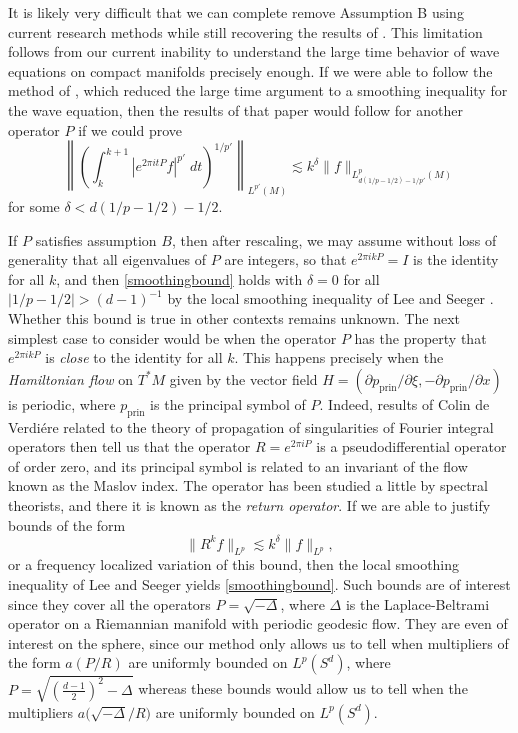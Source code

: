 \documentclass[11pt]{article}
\begin{document}
It is likely very difficult that we can complete remove Assumption B using current research methods while still recovering the results of \cite{DensonCharacterization}. This limitation follows from our current inability to understand the large time behavior of wave equations on compact manifolds precisely enough. If we were able to follow the method of \cite{DensonCharacterization}, which reduced the large time argument to a smoothing inequality for the wave equation, then the results of that paper would follow for another operator $P$ if we could prove
%
\begin{equation} \label{smoothingbound}
	\left\| \left( \int_k^{k+1} |e^{2 \pi i t P} f|^{p'}\; dt \right)^{1/p'} \right\|_{L^{p'}(M)} \lesssim k^\delta \| f \|_{L^p_{d(1/p - 1/2) - 1/p'}(M)}
\end{equation}
%
for some $\delta < d(1/p - 1/2) - 1/2$.

If $P$ satisfies assumption $B$, then after rescaling, we may assume without loss of generality that all eigenvalues of $P$ are integers, so that $e^{2 \pi i k P} = I$ is the identity for all $k$, and then \eqref{smoothingbound} holds with $\delta = 0$ for all $|1/p - 1/2| > (d-1)^{-1}$ by the local smoothing inequality of Lee and Seeger \cite{LeeSeeger}. Whether this bound is true in other contexts remains unknown. The next simplest case to consider would be when the operator $P$ has the property that $e^{2 \pi i k P}$ is \emph{close} to the identity for all $k$. This happens precisely when the \emph{Hamiltonian flow} on $T^* M$ given by the vector field $H = ( \partial p_{\text{prin}} / \partial \xi , - \partial p_{\text{prin}} / \partial x)$ is periodic, where $p_{\text{prin}}$ is the principal symbol of $P$. Indeed, results of Colin de Verdi\'{e}re \cite{ColinDeVerdiere} related to the theory of propagation of singularities of Fourier integral operators then tell us that the operator $R = e^{2 \pi i P}$ is a pseudodifferential operator of order zero, and its principal symbol is related to an invariant of the flow known as the Maslov index. The operator has been studied a little by spectral theorists, and there it is known as the \emph{return operator}. If we are able to justify bounds of the form
%
\[ \| R^k f \|_{L^p} \lesssim k^\delta \| f \|_{L^p}, \]
%
or a frequency localized variation of this bound, then the local smoothing inequality of Lee and Seeger yields \eqref{smoothingbound}. Such bounds are of interest since they cover all the operators $P = \sqrt{-\Delta}$, where $\Delta$ is the Laplace-Beltrami operator on a Riemannian manifold with periodic geodesic flow. They are even of interest on the sphere, since our method only allows us to tell when multipliers of the form $a( P/R )$ are uniformly bounded on $L^p(S^d)$, where $P = \sqrt{ ( {\scriptstyle \frac{d-1}{2}} )^2 - \Delta }$ whereas these bounds would allow us to tell when the multipliers $a \big( \sqrt{-\Delta} / R \big)$ are uniformly bounded on $L^p(S^d)$.
\end{document}
